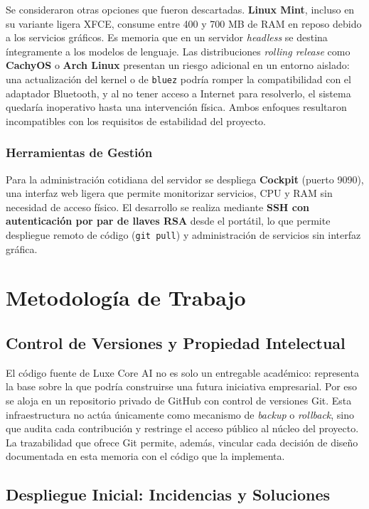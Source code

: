 Se consideraron otras opciones que fueron descartadas. \textbf{Linux Mint}, incluso en su variante ligera XFCE, consume entre 400 y 700 MB de RAM en reposo debido a los servicios gráficos. Es memoria que en un servidor \textit{headless} se destina íntegramente a los modelos de lenguaje. Las distribuciones \textit{rolling release} como \textbf{CachyOS} o \textbf{Arch Linux} presentan un riesgo adicional en un entorno aislado: una actualización del kernel o de \texttt{bluez} podría romper la compatibilidad con el adaptador Bluetooth, y al no tener acceso a Internet para resolverlo, el sistema quedaría inoperativo hasta una intervención física. Ambos enfoques resultaron incompatibles con los requisitos de estabilidad del proyecto.

\subsubsection{Herramientas de Gestión}

Para la administración cotidiana del servidor se despliega \textbf{Cockpit} (puerto 9090), una interfaz web ligera que permite monitorizar servicios, CPU y RAM sin necesidad de acceso físico. El desarrollo se realiza mediante \textbf{SSH con autenticación por par de llaves RSA} desde el portátil, lo que permite despliegue remoto de código (\texttt{git pull}) y administración de servicios sin interfaz gráfica.


\section{Metodología de Trabajo}

\subsection{Control de Versiones y Propiedad Intelectual}

El código fuente de Luxe Core AI no es solo un entregable académico: representa la base sobre la que podría construirse una futura iniciativa empresarial. Por eso se aloja en un repositorio privado de GitHub con control de versiones Git. Esta infraestructura no actúa únicamente como mecanismo de \textit{backup} o \textit{rollback}, sino que audita cada contribución y restringe el acceso público al núcleo del proyecto. La trazabilidad que ofrece Git permite, además, vincular cada decisión de diseño documentada en esta memoria con el código que la implementa.

\subsection{Despliegue Inicial: Incidencias y Soluciones}

